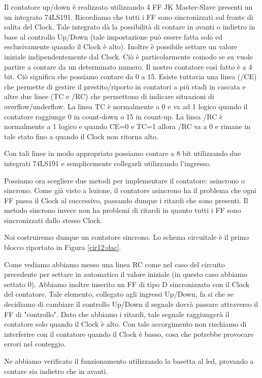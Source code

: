 Il contatore up/down è realizzato utilizzando 4 FF JK Master-Slave presenti un un integrato 74LS191. Ricordiamo che tutti i FF sono sincronizzati sul fronte di salita del Clock. Tale integrato dà la possibilità di contare in avanti o indietro in base al controllo Up/Down (tale impostazione può essere fatta solo ed esclusivamente quando il Clock è alto). Inoltre è possibile settare un valore iniziale indipendentemente dal Clock. Ciò è particolarmente comodo se su vuole partire a contare da un determinato numero. Il nostro contatore così fatto è a 4 bit. Ciò significa che possiamo contare da 0 a 15. Esiste tuttavia una linea (/CE) che permette di gestire il prestito/riporto in contatori a più stadi in cascata e altre due linee (TC e /RC) che permettono di indicare situazioni di overflow/underflow. La linea TC è normalmente a 0 e va ad 1 logico quando il contatore raggiunge 0 in count-down o 15 in count-up. La linea /RC è normalmente a 1 logico e quando CE=0 e TC=1 allora /RC va a 0 e rimane in tale stato fino a quando il Clock non ritorna alto.

Con tali linee in modo appropriato possiamo contare a 8 bit utilizzando due integrati 74LS191 e semplicemente collegarli utilizzando l'ingresso.

Possiamo ora scegliere due metodi per implementare il contatore: asincrono o sincrono. Come già visto a lezione, il contatore asincrono ha il problema che ogni FF passa il Clock al successivo, passando dunque i ritardi che sono presenti. Il metodo sincrono invece non ha problemi di ritardi in quanto tutti i FF sono sincronizzati dallo stesso Clock. 

Noi costruiremo dunque un contatore sincrono. Lo schema circuitale è il primo blocco riportato in Figura \ref{cir12:dac}.

Come vediamo abbiamo messo una linea RC come nel caso del circuito precedente per settare in automatico il valore iniziale (in questo caso abbiamo settato 0). Abbiamo inoltre inserito un FF di tipo D sincronizzato con il Clock del contatore. Tale elemento,  collegato agli ingressi Up/Down, fa si che se decidiamo di cambiare il controllo Up/Down il segnale dovrà passare attraverso il FF di "controllo". Dato che abbiamo i ritardi, tale segnale raggiungerà il contatore solo  quando il Clock è alto. Con tale accorgimento non rischiamo di interferire con il contatore quando il Clock è basso, cosa che potrebbe provocare errori nel conteggio.

Ne abbiamo verificato il funzionamento utilizzando la basetta al led, provando a contare sia indietro che in avanti. 

